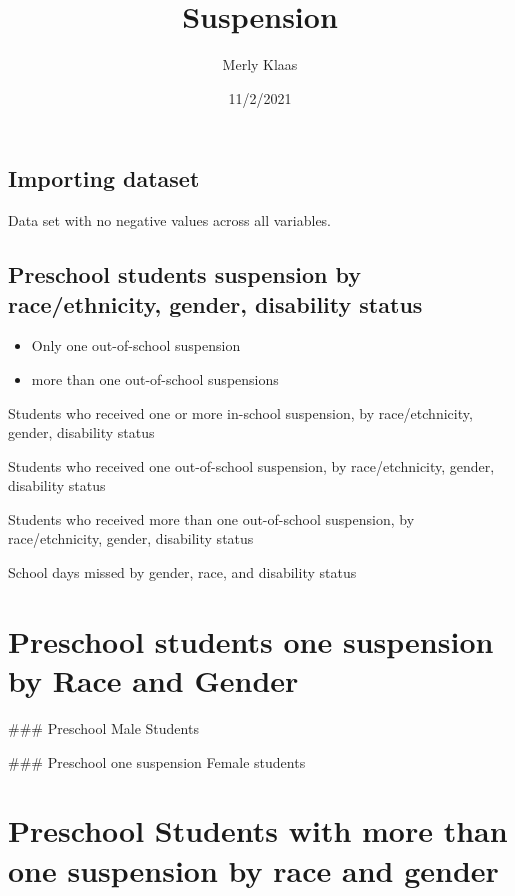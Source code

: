 \documentclass[
]{article}
\title{Suspension}
\author{Merly Klaas}
\date{11/2/2021}
\begin{document}
\maketitle

\hypertarget{importing-dataset}{%
\subsection{Importing dataset}\label{importing-dataset}}

Data set with no negative values across all variables.

\hypertarget{preschool-students-suspension-by-raceethnicity-gender-disability-status}{%
\subsection{Preschool students suspension by race/ethnicity, gender,
disability
status}\label{preschool-students-suspension-by-raceethnicity-gender-disability-status}}

\begin{itemize}
\item
  Only one out-of-school suspension
\item
  more than one out-of-school suspensions
\end{itemize}

Students who received one or more in-school suspension, by
race/etchnicity, gender, disability status

Students who received one out-of-school suspension, by race/etchnicity,
gender, disability status

Students who received more than one out-of-school suspension, by
race/etchnicity, gender, disability status

School days missed by gender, race, and disability status

\hypertarget{preschool-students-one-suspension-by-race-and-gender}{%
\section{Preschool students one suspension by Race and
Gender}\label{preschool-students-one-suspension-by-race-and-gender}}

\#\#\# Preschool Male Students

\#\#\# Preschool one suspension Female students

\hypertarget{preschool-students-with-more-than-one-suspension-by-race-and-gender}{%
\section{Preschool Students with more than one suspension by race and
gender}\label{preschool-students-with-more-than-one-suspension-by-race-and-gender}}
\end{document}
